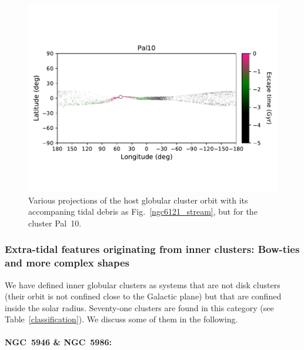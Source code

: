 \begin{figure}
                \includegraphics[clip=true, trim = 0mm 20mm 0mm 10mm, width=0.9\columnwidth]{images/PII_individual_Pal10_Pal10_LB_tesc.pdf}
                \caption{Various projections of the host globular cluster orbit with its accompaning tidal debris as Fig.~\ref{ngc6121_stream}, but for the cluster Pal~10. \label{pal10_stream}}
            \end{figure}
            \onecolumn  
            
        \subsubsection{Extra-tidal features originating from inner clusters: Bow-ties and more complex shapes}

            We have defined inner globular clusters as systems that are not disk clusters (their orbit is not confined close to the Galactic plane) but that are confined inside the solar radius. Seventy-one clusters are found in this category (see  Table~\ref{classification}). We discuss some of them in the following.

            \paragraph{NGC~5946 \& NGC~5986:}

